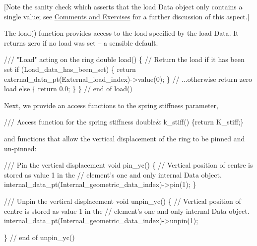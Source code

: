 \mbox{[}Note the sanity check which asserts that the load {\ttfamily Data} object only contains a single value; see \hyperlink{index_notes}{Comments and Exercises} for a further discussion of this aspect.\mbox{]}

The {\ttfamily load()} function provides access to the load specified by the load {\ttfamily Data}. It returns zero if no load was set -- a sensible default.


\begin{DoxyCodeInclude}
 \textcolor{comment}{/// "Load" acting on the ring}
 \textcolor{keywordtype}{double} load()
  \{
   \textcolor{comment}{// Return the load if it has been set}
   \textcolor{keywordflow}{if} (Load\_data\_has\_been\_set)
    \{
     \textcolor{keywordflow}{return} external\_data\_pt(External\_load\_index)->value(0);
    \}
   \textcolor{comment}{// ...otherwise return zero load}
   \textcolor{keywordflow}{else}
    \{
     \textcolor{keywordflow}{return} 0.0;
    \}
  \} \textcolor{comment}{// end of load()}

\end{DoxyCodeInclude}


Next, we provide an access functions to the spring stiffness parameter, 
\begin{DoxyCodeInclude}
 \textcolor{comment}{/// Access function for the spring stiffness}
 \textcolor{keywordtype}{double}& k\_stiff() \{\textcolor{keywordflow}{return} K\_stiff;\}

\end{DoxyCodeInclude}


and functions that allow the vertical displacement of the ring to be pinned and un-\/pinned\+:


\begin{DoxyCodeInclude}
 \textcolor{comment}{/// Pin the vertical displacement}
 \textcolor{keywordtype}{void} pin\_yc()
  \{
   \textcolor{comment}{// Vertical position of centre is stored as value 1 in the}
   \textcolor{comment}{// element's one and only internal Data object.}
   internal\_data\_pt(Internal\_geometric\_data\_index)->pin(1);
  \}

\textcolor{comment}{}
\textcolor{comment}{ /// Unpin the vertical displacement}
\textcolor{comment}{} \textcolor{keywordtype}{void} unpin\_yc()
  \{
   \textcolor{comment}{// Vertical position of centre is stored as value 1 in the}
   \textcolor{comment}{// element's one and only internal Data object.}
   internal\_data\_pt(Internal\_geometric\_data\_index)->unpin(1);

  \} \textcolor{comment}{// end of unpin\_yc()}

\end{DoxyCodeInclude}



